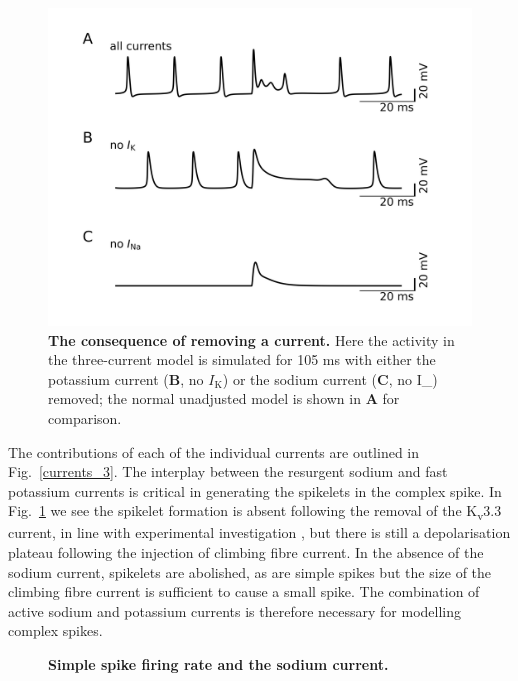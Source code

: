 \documentclass[twocolumn]{svjour3}          %
\renewcommand{\k}{\mathrm{K}}
\newcommand{\na}{\mathrm{Na}}
\begin{document}
\begin{figure}[!ht]
  \begin{center}
    \includegraphics{figure_no_current.jpg}
  \end{center}
  \caption{\textbf{The consequence of removing a current.} Here the
    activity in the three-current model is simulated for 105 ms with
    either the potassium current (\textbf{B}, no $I_\k$) or the sodium current
    (\textbf{C}, no I_\na) removed; the normal unadjusted model is shown in \textbf{A} for comparison.}
\label{fig:no_current}
\end{figure}
  
The contributions of each of the individual currents are outlined in
Fig.~\ref{currents_3}.  The interplay between the resurgent sodium and
fast potassium currents is critical in generating the spikelets in the
complex spike. In Fig.~\ref{fig:no_current} we see the spikelet
formation is absent following the removal of the K\textsubscript{v}3.3
current, in line with experimental investigation
\citep{ZaghaEtAl2010}, but there is still a depolarisation plateau
following the injection of climbing fibre current. In the absence of
the sodium current, spikelets are abolished, as are simple spikes but
the size of the climbing fibre current is sufficient to cause a small
spike. The combination of active sodium and potassium currents is
therefore necessary for modelling complex spikes.

\begin{figure}[!ht]
  
\caption{\textbf{Simple spike firing rate and the sodium current.}} 
\label{fig:ss_v_grna}
\end{figure}
\end{document}
